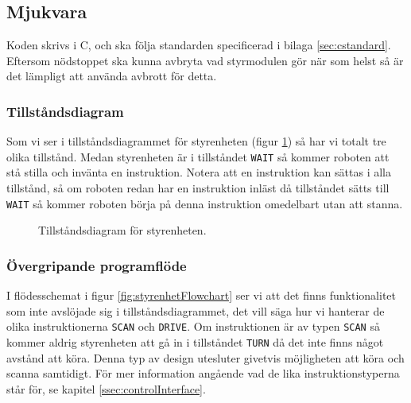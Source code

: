 \documentclass[a4paper,11pt]{article}
\begin{document}
\subsection{Mjukvara}
Koden skrivs i C, och ska följa standarden specificerad i bilaga \ref{sec:cstandard}. Eftersom nödstoppet ska kunna avbryta vad styrmodulen gör när som helst så är det lämpligt att använda avbrott för detta.

\subsubsection{Tillståndsdiagram}
Som vi ser i tillståndsdiagrammet för styrenheten (figur \ref{fig:stateDiagram}) så har vi totalt tre olika tillstånd. Medan styrenheten är i tillståndet \texttt{WAIT} så kommer roboten att stå stilla och invänta en instruktion. Notera att en instruktion kan sättas i alla tillstånd, så om roboten redan har en instruktion inläst då tillståndet sätts till \texttt{WAIT} så kommer roboten börja på denna instruktion omedelbart utan att stanna.

\begin{figure}[h!]
	\caption{Tillståndsdiagram för styrenheten.}
	\label{fig:stateDiagram}
\end{figure}

\subsubsection{Övergripande programflöde}
I flödesschemat i figur \ref{fig:styrenhetFlowchart} ser vi att det finns funktionalitet som inte avslöjade sig i tillståndsdiagrammet, det vill säga hur vi hanterar de olika instruktionerna \texttt{SCAN} och \texttt{DRIVE}. Om instruktionen är av typen \texttt{SCAN} så kommer aldrig styrenheten att gå in i tillståndet \texttt{TURN} då det inte finns något avstånd att köra. Denna typ av design utesluter givetvis möjligheten att köra och scanna samtidigt. För mer information angående vad de lika instruktionstyperna står för, se kapitel \ref{ssec:controlInterface}. 
\end{document}
